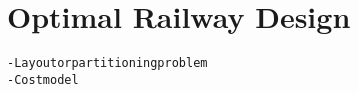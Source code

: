 \section{Optimal Railway Design}\label{sec:optimal}

\begin{alltt}\scriptsize
- Layout or partitioning problem
    - Cost model
\end{alltt}
